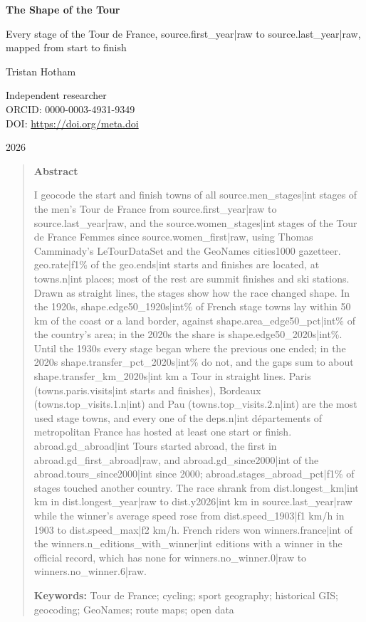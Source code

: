 \documentclass[11pt,a4paper]{article}
\begin{document}
\begin{center}
{\Large\bfseries The Shape of the Tour\par}
\vspace{0.4em}
{\large Every stage of the Tour de France, {{source.first_year|raw}} to {{source.last_year|raw}}, mapped from start to finish\par}
\vspace{1.2em}
{\large Tristan Hotham\par}
\vspace{0.3em}
{\small Independent researcher\\
ORCID: 0000-0003-4931-9349\\
DOI: \href{https://doi.org/{{meta.doi}}}{https://doi.org/{{meta.doi}}}\par}
\vspace{0.8em}
2026
\end{center}

\begin{quote}
\small
\begin{center}\textbf{Abstract}\end{center}
I geocode the start and finish towns of all {{source.men_stages|int}} stages of the men's Tour de France from {{source.first_year|raw}} to {{source.last_year|raw}}, and the {{source.women_stages|int}} stages of the Tour de France Femmes since {{source.women_first|raw}}, using Thomas Camminady's LeTourDataSet and the GeoNames cities1000 gazetteer. {{geo.rate|f1}}\% of the {{geo.ends|int}} starts and finishes are located, at {{towns.n|int}} places; most of the rest are summit finishes and ski stations. Drawn as straight lines, the stages show how the race changed shape. In the 1920s, {{shape.edge50_1920s|int}}\% of French stage towns lay within 50 km of the coast or a land border, against {{shape.area_edge50_pct|int}}\% of the country's area; in the 2020s the share is {{shape.edge50_2020s|int}}\%. Until the 1930s every stage began where the previous one ended; in the 2020s {{shape.transfer_pct_2020s|int}}\% do not, and the gaps sum to about {{shape.transfer_km_2020s|int}} km a Tour in straight lines. Paris ({{towns.paris.visits|int}} starts and finishes), Bordeaux ({{towns.top_visits.1.n|int}}) and Pau ({{towns.top_visits.2.n|int}}) are the most used stage towns, and every one of the {{deps.n|int}} départements of metropolitan France has hosted at least one start or finish. {{abroad.gd_abroad|int}} Tours started abroad, the first in {{abroad.gd_first_abroad|raw}}, and {{abroad.gd_since2000|int}} of the {{abroad.tours_since2000|int}} since 2000; {{abroad.stages_abroad_pct|f1}}\% of stages touched another country. The race shrank from {{dist.longest_km|int}} km in {{dist.longest_year|raw}} to {{dist.y2026|int}} km in {{source.last_year|raw}} while the winner's average speed rose from {{dist.speed_1903|f1}} km/h in 1903 to {{dist.speed_max|f2}} km/h. French riders won {{winners.france|int}} of the {{winners.n_editions_with_winner|int}} editions with a winner in the official record, which has none for {{winners.no_winner.0|raw}} to {{winners.no_winner.6|raw}}.

\textbf{Keywords:} Tour de France; cycling; sport geography; historical GIS; geocoding; GeoNames; route maps; open data
\end{quote}
\end{document}
